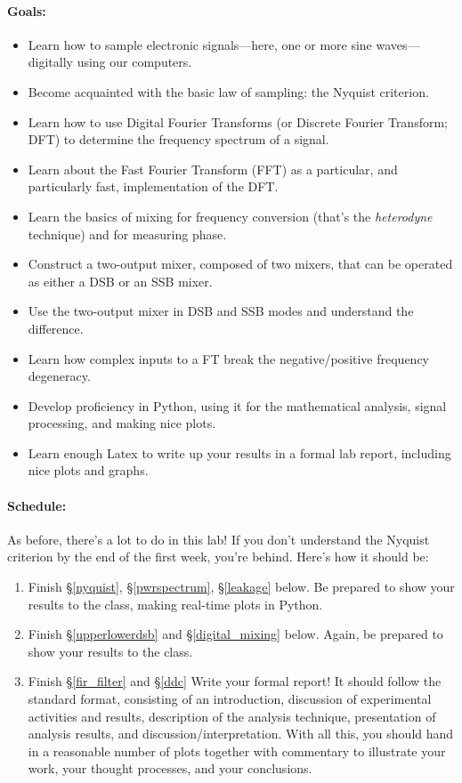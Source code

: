 \documentclass[11pt]{article}
\begin{document}
\paragraph{Goals:}
\begin{itemize}[noitemsep,nolistsep]
\item Learn how to sample electronic signals---here, one or more sine
  waves---digitally using our computers.
\item Become acquainted with the basic law of sampling: the Nyquist
  criterion.
\item Learn how to use Digital Fourier Transforms (or Discrete Fourier
  Transform; DFT) to determine the
  frequency spectrum of a signal.
\item Learn about the Fast Fourier Transform (FFT) as a particular, and
  particularly fast, implementation of the DFT.
\item Learn the basics of mixing for frequency conversion (that's
  the {\it heterodyne} technique) and for measuring phase.
\item Construct a two-output mixer, composed of two mixers, that can be
  operated as either a DSB or an SSB mixer.
\item Use the two-output mixer in DSB and SSB modes and understand the
  difference.
\item Learn how complex inputs to a FT break the negative/positive
  frequency degeneracy.
\item Develop proficiency in Python, using it for the
  mathematical analysis, signal processing, and making nice plots.
\item Learn enough Latex to write up your results in a formal lab report,
  including nice plots and graphs.
\end{itemize}

\paragraph{Schedule:}

As before, there's a lot to do in this lab! If you don't understand the Nyquist criterion
by the end of the first week, you're behind. Here's how it should be:

\begin{enumerate}
\item Finish \S \ref{nyquist},
  \S \ref{pwrspectrum}, \S \ref{leakage} below. Be prepared to show your
  results to the class, making real-time plots in Python.
\item Finish \S \ref{upperlowerdsb} and \S \ref{digital_mixing}
  below. Again, be prepared to show your results to the class.
\item Finish \S \ref{fir_filter} and \S \ref{ddc}
    Write your formal report!
  It should follow the standard format, consisting of an introduction,
  discussion of experimental activities and results, description of the
  analysis technique, presentation of analysis results, and
  discussion/interpretation. With all this, you should hand in a
  reasonable number of plots together with commentary to illustrate your
  work, your thought processes, and your conclusions.
\end{enumerate}
\end{document}
